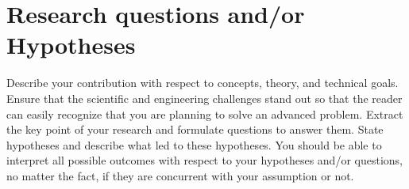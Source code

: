 \section*{Research questions and/or Hypotheses}
Describe your contribution with respect to concepts, theory, and technical goals. Ensure that the scientific and engineering challenges stand out so that the reader can easily recognize that you are planning to solve an advanced problem. 
Extract the key point of your research and formulate questions to answer them.
State hypotheses and describe what led to these hypotheses.
You should be able to interpret all possible outcomes with respect to your hypotheses and/or questions, no matter the fact, if they are concurrent with your assumption or not.